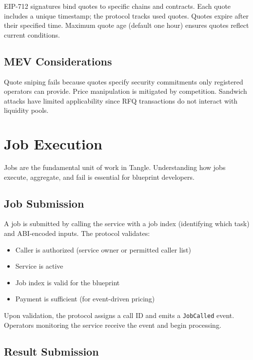 \documentclass[11pt,a4paper]{article}
\begin{document}
EIP-712 signatures bind quotes to specific chains and contracts. Each quote includes a unique timestamp; the protocol tracks used quotes. Quotes expire after their specified time. Maximum quote age (default one hour) ensures quotes reflect current conditions.

\subsection{MEV Considerations}

Quote sniping fails because quotes specify security commitments only registered operators can provide. Price manipulation is mitigated by competition. Sandwich attacks have limited applicability since RFQ transactions do not interact with liquidity pools.

\section{Job Execution}

Jobs are the fundamental unit of work in Tangle. Understanding how jobs execute, aggregate, and fail is essential for blueprint developers.

\subsection{Job Submission}

A job is submitted by calling the service with a job index (identifying which task) and ABI-encoded inputs. The protocol validates:
\begin{itemize}[noitemsep]
    \item Caller is authorized (service owner or permitted caller list)
    \item Service is active
    \item Job index is valid for the blueprint
    \item Payment is sufficient (for event-driven pricing)
\end{itemize}

Upon validation, the protocol assigns a call ID and emits a \texttt{JobCalled} event. Operators monitoring the service receive the event and begin processing.

\subsection{Result Submission}
\end{document}
